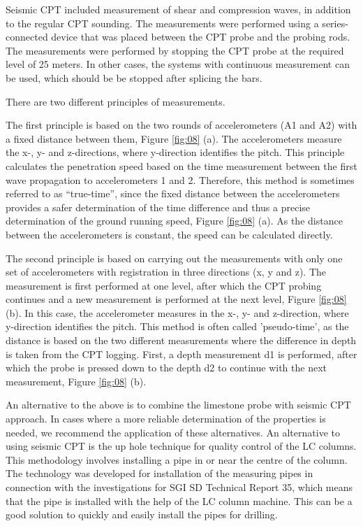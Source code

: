 \documentclass[final,3p,times,twocolumn]{elsarticle}
\begin{document}
Seismic CPT included measurement of shear and compression waves, in addition to the regular CPT sounding. The measurements were performed using a series-connected device that was placed between the CPT probe and the probing rods. The measurements were performed by stopping the CPT probe at the required level of 25 meters. In other cases, the systems with continuous measurement can be used, which should be be stopped after splicing the bars.

There are two different principles of measurements.

The first principle is based on the two rounds of accelerometers (A1 and A2) with a fixed distance between them, Figure \ref{fig:08} (a). The accelerometers measure the x-, y- and z-directions, where y-direction identifies the pitch. This principle calculates the penetration speed based on the time measurement between the first wave propagation to accelerometers 1 and 2. Therefore, this method is sometimes referred to as “true-time”, since the fixed distance between the accelerometers provides a safer determination of the time difference and thus a precise determination of the ground running speed, Figure \ref{fig:08} (a). 
As the distance between the accelerometers is constant, the speed can be calculated directly.

The second principle is based on carrying out the measurements with only one set of accelerometers with registration in three directions (x, y and z). The measurement is first performed at one level, after which the CPT probing continues and a new measurement is performed at the next level, Figure \ref{fig:08} (b). In this case, the accelerometer measures in the x-, y- and z-direction, where y-direction identifies the pitch. This method is often called 'pseudo-time', as the distance is based on the two different measurements where the difference in depth is taken from the CPT logging. First, a depth measurement d1 is performed, after which the probe is pressed down to the depth d2 to continue with the next measurement, Figure \ref{fig:08} (b).

An alternative to the above is to combine the limestone probe with seismic CPT approach. In cases where a more reliable determination of the properties is needed, we recommend the application of these alternatives. An alternative to using seismic CPT is the up hole technique for quality control of the LC columns. This methodology involves installing a pipe in or near the centre of the column. The technology was developed for installation of the measuring pipes in connection with the investigations for SGI SD Technical Report 35, which means that the pipe is installed with the help of the LC column machine. This can be a good solution to quickly and easily install the pipes for drilling. 
\end{document}
